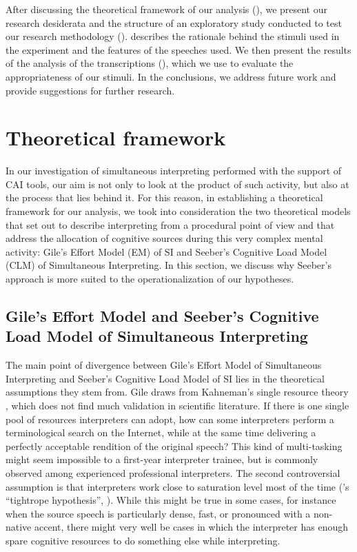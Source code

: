 \documentclass[output=paper]{langsci/langscibook}
\begin{document}
After discussing the theoretical framework of our analysis (), we present our research desiderata and the structure of an exploratory study conducted to test our research methodology ().  describes the rationale behind the stimuli used in the experiment and the features of the speeches used. We then present the results of the analysis of the transcriptions (), which we use to evaluate the appropriateness of our stimuli. In the conclusions, we address future work and provide suggestions for further research.

\section{Theoretical framework}\label{sec:prandi:2}
In our investigation of simultaneous interpreting performed with the support of \textsc{CAI} tools, our aim is not only to look at the product of such activity, but also at the process that lies behind it. For this reason, in establishing a theoretical framework for our analysis, we took into consideration the two theoretical models that set out to describe interpreting from a procedural point of view and that address the allocation of cognitive sources during this very complex mental activity: Gile’s Effort Model (EM) of \textsc{SI} and Seeber’s Cognitive Load Model (\textsc{CLM}) of Simultaneous Interpreting. In this section, we discuss why Seeber’s approach is more suited to the operationalization of our hypotheses.

\subsection{Gile’s Effort Model and Seeber’s Cognitive Load Model of Simultaneous Interpreting}\label{sec:prandi:2.1}
The main point of divergence between Gile’s Effort Model of Simultaneous Interpreting \citep{Gile1988, Gile1997, Gile1999} and Seeber’s Cognitive Load Model of \textsc{SI} lies in the theoretical assumptions they stem from. Gile draws from Kahneman’s single resource theory \citep{Kahneman1973}, which does not find much validation in scientific literature. If there is one single pool of resources interpreters can adopt, how can some interpreters perform a terminological search on the Internet, while at the same time delivering a perfectly acceptable rendition of the original speech? This kind of multi-tasking might seem impossible to a first-year interpreter trainee, but is commonly observed among experienced professional interpreters. The second controversial assumption is that interpreters work close to saturation level most of the time (\citeauthor{Gile1999}’s ``tightrope hypothesis'', \citeyear{Gile1999}). While this might be true in some cases, for instance when the source speech is particularly dense, fast, or pronounced with a non-native accent, there might very well be cases in which the interpreter has enough spare cognitive resources to do something else while interpreting. 
\end{document}
